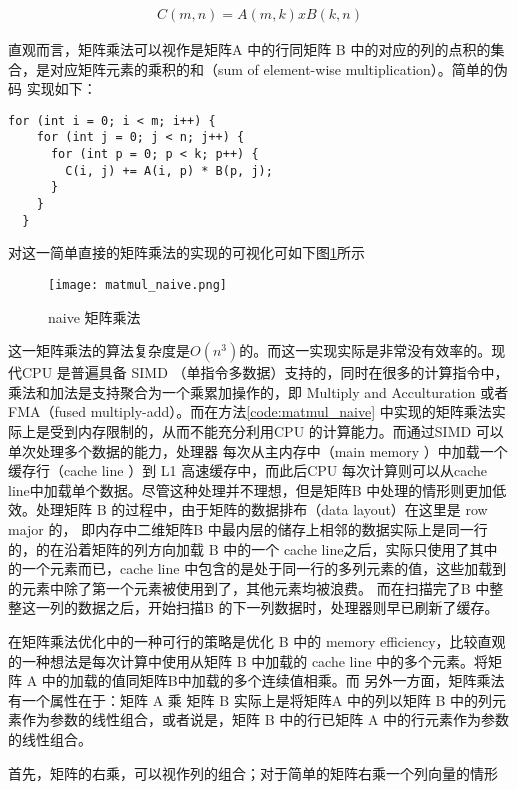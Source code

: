 \begin{align}
  C(m, n) = A(m, k) x B(k, n)
\end{align}

直观而言，矩阵乘法可以视作是矩阵A 中的行同矩阵 B 中的对应的列的点积的集合，是对应矩阵元素的乘积的和（sum of element-wise multiplication）。简单的伪码
实现如下：

\begin{lstlisting}[label={code:matmul_naive}, caption={矩阵乘法}]
  for (int i = 0; i < m; i++) {
    for (int j = 0; j < n; j++) {
      for (int p = 0; p < k; p++) {
        C(i, j) += A(i, p) * B(p, j);
      }
    }
  }
\end{lstlisting}

对这一简单直接的矩阵乘法的实现的可视化可如下图\ref{fig:naive_matmul}所示

\begin{figure}
\centering
\texttt{[image: matmul\_naive.png]}
\caption{naive 矩阵乘法}
\label{fig:naive_matmul}
\end{figure}

这一矩阵乘法的算法复杂度是$O(n^3)$的。而这一实现实际是非常没有效率的。现代CPU 是普遍具备 SIMD （单指令多数据）支持的，同时在很多的计算指令中，乘法和加法是支持聚合为一个乘累加操作的，即 Multiply and 
Acculturation 或者 FMA（fused multiply-add）。而在方法\ref{code:matmul_naive} 中实现的矩阵乘法实际上是受到内存限制的，从而不能充分利用CPU 的计算能力。而通过SIMD 可以单次处理多个数据的能力，处理器
每次从主内存中（main memory ）中加载一个缓存行（cache line ）到 L1 高速缓存中，而此后CPU 每次计算则可以从cache line中加载单个数据。尽管这种处理并不理想，但是矩阵B 中处理的情形则更加低效。处理矩阵 B
的过程中，由于矩阵的数据排布（data layout）在这里是 row major 的， 即内存中二维矩阵B 中最内层的储存上相邻的数据实际上是同一行的，的在沿着矩阵的列方向加载 B 中的一个 cache line之后，实际只使用了其中
的一个元素而已，cache line 中包含的是处于同一行的多列元素的值，这些加载到的元素中除了第一个元素被使用到了，其他元素均被浪费。
而在扫描完了B 中整整这一列的数据之后，开始扫描B 的下一列数据时，处理器则早已刷新了缓存。

在矩阵乘法优化中的一种可行的策略是优化 B 中的 memory efficiency，比较直观的一种想法是每次计算中使用从矩阵 B 中加载的 cache line 中的多个元素。将矩阵 A 中的加载的值同矩阵B中加载的多个连续值相乘。而
另外一方面，矩阵乘法有一个属性在于：矩阵 A 乘 矩阵 B 实际上是将矩阵A 中的列以矩阵 B 中的列元素作为参数的线性组合，或者说是，矩阵 B 中的行已矩阵 A 中的行元素作为参数的线性组合。

首先，矩阵的右乘，可以视作列的组合；对于简单的矩阵右乘一个列向量的情形

